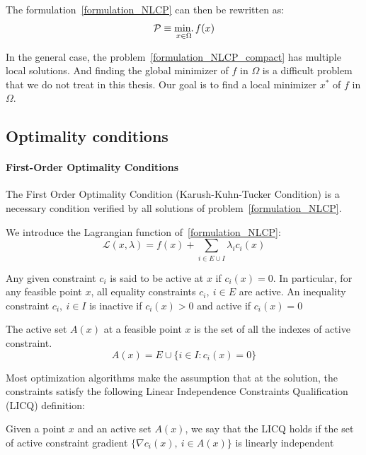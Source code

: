 The formulation~\ref{formulation_NLCP} can then be rewritten as:
\begin{equation}
  \label{formulation_NLCP_compact}
  \mathcal{P} \equiv \operatorname*{min.}_{x\in\Omega}{f(x)}
\end{equation}

In the general case, the problem~\ref{formulation_NLCP_compact} has multiple local solutions.
And finding the global minimizer of $f$ in $\Omega$ is a difficult problem that we do not treat in this thesis.
Our goal is to find a local minimizer $x^*$ of $f$ in $\Omega$.

\subsection{Optimality conditions}
\label{sub:optimality_conditions}

\paragraph{First-Order Optimality Conditions}

The First Order Optimality Condition (Karush-Kuhn-Tucker Condition) is a necessary condition verified by all solutions of problem~\ref{formulation_NLCP}.

We introduce the Lagrangian function of~\ref{formulation_NLCP}:
\begin{equation}
  \mathcal{L}(x,\lambda) = f(x) + \sum_{i\in E\cup I}\lambda_i c_i(x)
\end{equation}

Any given constraint $c_i$ is said to be active at $x$ if $c_i(x)=0$.
In particular, for any feasible point $x$, all equality constraints $c_i,\ i\in E$ are active.
An inequality constraint $c_i,\ i\in I$ is inactive if $c_i(x)>0$ and active if $c_i(x) = 0$

\begin{definition}
\label{active_set}
  The active set $\mathit{A}(x)$ at a feasible point $x$ is the set of all the indexes of active constraint.
  \begin{equation}
    \mathit{A}(x)=E\cup\{i\in I: c_i(x) = 0\}
  \end{equation}
\end{definition}

Most optimization algorithms make the assumption that at the solution, the constraints satisfy the following Linear Independence Constraints Qualification (LICQ) definition:

\begin{definition}
  Given a point $x$ and an active set $\mathit{A}(x)$, we say that the LICQ holds if the set of active constraint gradient $\{\nabla c_i(x),\ i\in \mathit{A}(x)\}$ is linearly independent
\end{definition}

